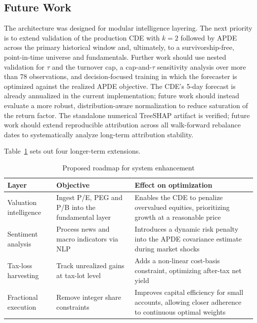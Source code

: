 \documentclass[conference]{IEEEtran}
\begin{document}
\subsection{Future Work}
\label{sec:future}
The architecture was designed for modular intelligence layering. The
next priority is to extend validation of the production CDE with $k=2$
followed by APDE across the primary historical window and, ultimately,
to a survivorship-free, point-in-time universe and fundamentals. Further work should use nested validation for $\tau$ and the turnover cap, a
cap-and-$\tau$ sensitivity analysis over more than 78 observations, and
decision-focused training in which the forecaster is optimized against
the realized APDE objective. The CDE's 5-day forecast is already
annualized in the current implementation; future work should instead
evaluate a more robust, distribution-aware normalization to reduce
saturation of the return factor. The standalone numerical TreeSHAP
artifact is verified; future work should extend reproducible attribution
across all walk-forward rebalance dates to systematically analyze
long-term attribution stability.

Table~\ref{tab:roadmap} sets out four longer-term extensions.

\begin{table}[t]
\caption{Proposed roadmap for system enhancement}
\label{tab:roadmap}
\centering
\setlength{\tabcolsep}{3pt}
\renewcommand{\arraystretch}{1.2}
\begin{tabular}{@{}p{1.6cm}p{2.5cm}p{2.9cm}@{}}
\toprule
\textbf{Layer} & \textbf{Objective} & \textbf{Effect on optimization} \\
\midrule
Valuation intelligence & Ingest P/E, PEG and P/B into the fundamental layer & Enables the CDE to penalize overvalued equities, prioritizing growth at a reasonable price \\
Sentiment analysis & Process news and macro indicators via NLP & Introduces a dynamic risk penalty into the APDE covariance estimate during market shocks \\
Tax-loss harvesting & Track unrealized gains at tax-lot level & Adds a non-linear cost-basis constraint, optimizing after-tax net yield \\
Fractional execution & Remove integer share constraints & Improves capital efficiency for small accounts, allowing closer adherence to continuous optimal weights \\
\bottomrule
\end{tabular}
\end{table}
\end{document}
